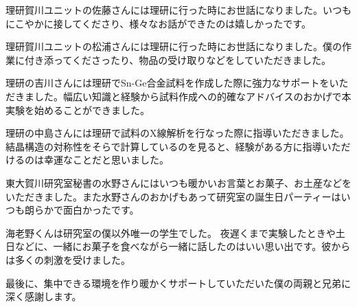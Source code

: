 理研賀川ユニットの佐藤さんには理研に行った時にお世話になりました。いつもにこやかに接してくださり、様々なお話ができたのは嬉しかったです。

理研賀川ユニットの松浦さんには理研に行った時にお世話になりました。僕の作業に付き添ってくださったり、物品の受け取りなどをしていただきました。

理研の吉川さんには理研でSn-Ge合金試料を作成した際に強力なサポートをいただきました。幅広い知識と経験から試料作成への的確なアドバイスのおかげで本実験を始めることができました。

理研の中島さんには理研で試料のX線解析を行なった際に指導いただきました。結晶構造の対称性をそらで計算しているのを見ると、経験がある方に指導いただけるのは幸運なことだと思いました。

東大賀川研究室秘書の水野さんにはいつも暖かいお言葉とお菓子、お土産などをいただきました。また水野さんのおかげもあって研究室の誕生日パーティーはいつも朗らかで面白かったです。

海老野くんは研究室の僕以外唯一の学生でした。
夜遅くまで実験したときや土日などに、一緒にお菓子を食べながら一緒に話したのはいい思い出です。彼からは多くの刺激を受けました。

最後に、集中できる環境を作り暖かくサポートしていただいた僕の両親と兄弟に深く感謝します。

\newpage
